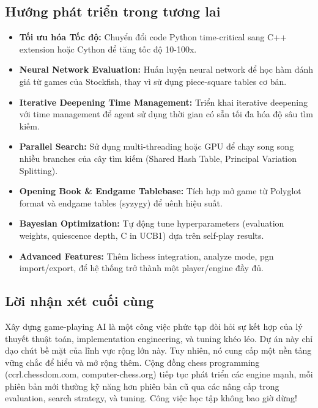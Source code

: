 \subsection{Hướng phát triển trong tương lai}
\begin{itemize}
    \item \textbf{Tối ưu hóa Tốc độ:} Chuyển đổi code Python time-critical sang C++ extension hoặc Cython để tăng tốc độ 10-100x.

    \item \textbf{Neural Network Evaluation:} Huấn luyện neural network để học hàm đánh giá từ games của Stockfish, thay vì sử dụng piece-square tables cơ bản.

    \item \textbf{Iterative Deepening Time Management:} Triển khai iterative deepening với time management để agent sử dụng thời gian có sẵn tối đa hóa độ sâu tìm kiếm.

    \item \textbf{Parallel Search:} Sử dụng multi-threading hoặc GPU để chạy song song nhiều branches của cây tìm kiếm (Shared Hash Table, Principal Variation Splitting).

    \item \textbf{Opening Book \& Endgame Tablebase:} Tích hợp mở game từ Polyglot format và endgame tables (syzygy) để uênh hiệu suất.

    \item \textbf{Bayesian Optimization:} Tự động tune hyperparameters (evaluation weights, quiescence depth, C in UCB1) dựa trên self-play results.

    \item \textbf{Advanced Features:} Thêm lichess integration, analyze mode, pgn import/export, để hệ thống trở thành một player/engine đầy đủ.
\end{itemize}

\subsection{Lời nhận xét cuối cùng}
Xây dựng game-playing AI là một công việc phức tạp đòi hỏi sự kết hợp của lý thuyết thuật toán, implementation engineering, và tuning khéo léo. Dự án này chỉ dạo chút bề mặt của lĩnh vực rộng lớn này. Tuy nhiên, nó cung cấp một nền tảng vững chắc để hiểu và mở rộng thêm. Cộng đồng chess programming (ccrl.chessdom.com, computer-chess.org) tiếp tục phát triển các engine mạnh, mỗi phiên bản mới thường kỹ năng hơn phiên bản cũ qua các nâng cấp trong evaluation, search strategy, và tuning. Công việc học tập không bao giờ dừng!

